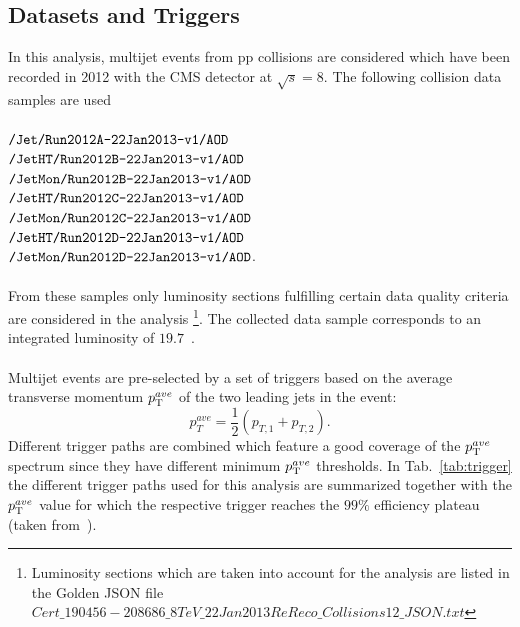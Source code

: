 \subsection{Datasets and Triggers}
\label{subsec:jer_samples_and_trigger}
In this analysis, multijet events from pp collisions are considered which have been recorded in 2012 with the CMS detector at $\sqrt{s}=8$\tev. The following collision data samples are used \\
\\
$\verb+/Jet/Run2012A-22Jan2013-v1/AOD+$ \\ 
$\verb+/JetHT/Run2012B-22Jan2013-v1/AOD+$ \\
$\verb+/JetMon/Run2012B-22Jan2013-v1/AOD+$ \\
$\verb+/JetHT/Run2012C-22Jan2013-v1/AOD+$ \\
$\verb+/JetMon/Run2012C-22Jan2013-v1/AOD+$ \\
$\verb+/JetHT/Run2012D-22Jan2013-v1/AOD+$ \\
$\verb+/JetMon/Run2012D-22Jan2013-v1/AOD+$. \\
\\
From these samples only luminosity sections fulfilling certain data quality criteria are considered in the analysis \footnote{Luminosity sections which are taken into account for the analysis are listed in the Golden JSON file $Cert\_190456-208686\_8TeV\_22Jan2013ReReco\_Collisions12\_JSON.txt$ }. The collected data sample corresponds to an integrated luminosity of $19.7$~\fbinv. \\
\\
Multijet events are pre-selected by a set of triggers based on the average transverse momentum $p_{\text{T}}^{ave}$ of the two leading jets in the event:  
\begin{equation}
 p_{T}^{ave} = \frac{1}{2} (p_{T,1} + p_{T,2}).
\end{equation} 
Different trigger paths are combined which feature a good coverage of the $p_{\text{T}}^{ave}$ spectrum since they have different minimum $p_{\text{T}}^{ave}$ thresholds. In Tab.~\ref{tab:trigger} the different trigger paths used for this analysis are summarized together with the $p_{\text{T}}^{ave}$ value for which the respective trigger reaches the $99\%$ efficiency plateau (taken from~\cite{website:HamburgCalib}).

